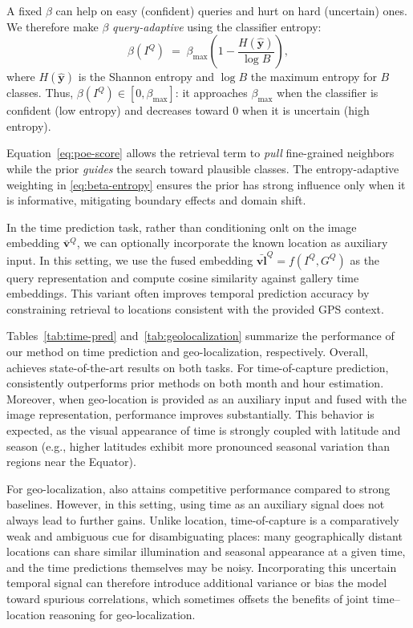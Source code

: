 A fixed $\beta$ can help on easy (confident) queries and hurt on hard (uncertain) ones. We therefore make $\beta$ \emph{query-adaptive} using the classifier entropy:
\begin{equation}
    \label{eq:beta-entropy}
    \beta(I^{Q})
    \;=\;
    \beta_{\max}\!\left(
    1 - \frac{H(\hat{\mathbf{y}})}{\log B}
    \right),
\end{equation}
where $H(\hat{\mathbf{y}})$ is the Shannon entropy and $\log B$ the maximum entropy for $B$ classes. Thus, $\beta(I^{Q})\!\in[0,\beta_{\max}]$: it approaches $\beta_{\max}$ when the classifier is confident (low entropy) and decreases toward $0$ when it is uncertain (high entropy).

Equation~\eqref{eq:poe-score} allows the retrieval term to \emph{pull} fine-grained neighbors while the prior \emph{guides} the search toward plausible classes. The entropy-adaptive weighting in \eqref{eq:beta-entropy} ensures the prior has strong influence only when it is informative, mitigating boundary effects and domain shift.

In the time prediction task, rather than conditioning onlt on the image embedding $\bar{\mathbf{v}}^{Q}$, we can optionally incorporate the known location as auxiliary input. In this setting, we use the fused embedding $\bar{\mathbf{vl}}^{Q}=f(I^{Q},G^{Q})$ as the query representation and compute cosine similarity against gallery time embeddings. This variant often improves temporal prediction accuracy by constraining retrieval to locations consistent with the provided GPS context.

Tables~\ref{tab:time-pred} and~\ref{tab:geolocalization} summarize the performance of our method on time prediction and geo-localization, respectively. Overall, \tiger achieves state-of-the-art results on both tasks. For time-of-capture prediction, \tiger consistently outperforms prior methods on both month and hour estimation. Moreover, when geo-location is provided as an auxiliary input and fused with the image representation, performance improves substantially. This behavior is expected, as the visual appearance of time is strongly coupled with latitude and season (e.g., higher latitudes exhibit more pronounced seasonal variation than regions near the Equator).

For geo-localization, \tiger also attains competitive performance compared to strong baselines. However, in this setting, using time as an auxiliary signal does not always lead to further gains. Unlike location, time-of-capture is a comparatively weak and ambiguous cue for disambiguating places: many geographically distant locations can share similar illumination and seasonal appearance at a given time, and the time predictions themselves may be noisy. Incorporating this uncertain temporal signal can therefore introduce additional variance or bias the model toward spurious correlations, which sometimes offsets the benefits of joint time–location reasoning for geo-localization.

